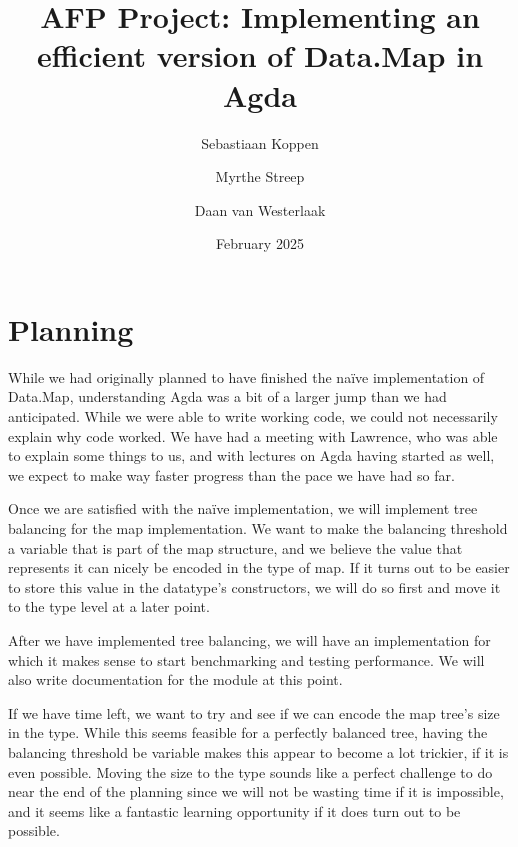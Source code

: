 \documentclass[a4paper,UKenglish,cleveref, autoref, thm-restate]{template/lipics-v2021}
\title{AFP Project: Implementing an efficient version of Data.Map in Agda}
\author{Sebastiaan Koppen}{Utrecht University, Netherlands}{}{}{}
\author{Myrthe Streep}{Utrecht University, Netherlands}{}{}{}
\author{Daan van Westerlaak}{Utrecht University, Netherlands}{}{}{}
\date{February 2025}
\begin{document}
\maketitle

\section{Planning}

While we had originally planned to have finished the na\"ive implementation of Data.Map, understanding Agda was a bit of a larger jump than we had anticipated.
While we were able to write working code, we could not necessarily explain why code worked.
We have had a meeting with Lawrence, who was able to explain some things to us, and with lectures on Agda having started as well, we expect to make way faster progress than the pace we have had so far.

Once we are satisfied with the na\"ive implementation, we will implement tree balancing for the map implementation.
We want to make the balancing threshold a variable that is part of the map structure, and we believe the value that represents it can nicely be encoded in the type of map.
If it turns out to be easier to store this value in the datatype's constructors, we will do so first and move it to the type level at a later point.

After we have implemented tree balancing, we will have an implementation for which it makes sense to start benchmarking and testing performance.
We will also write documentation for the module at this point.

If we have time left, we want to try and see if we can encode the map tree's size in the type.
While this seems feasible for a perfectly balanced tree, having the balancing threshold be variable makes this appear to become a lot trickier, if it is even possible.
Moving the size to the type sounds like a perfect challenge to do near the end of the planning since we will not be wasting time if it is impossible, and it seems like a fantastic learning opportunity if it does turn out to be possible.
\end{document}
